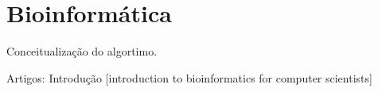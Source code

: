 \chapter{Bioinformática}

\indent Conceitualização do algortimo.

Artigos:
Introdução
[introduction to bioinformatics for computer scientists]